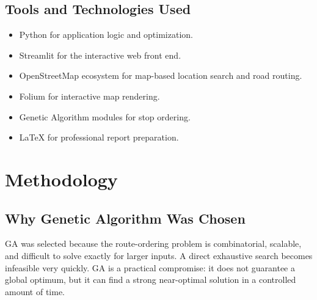 
\subsection{Tools and Technologies Used}
\begin{itemize}[leftmargin=1.5em]
    \item Python for application logic and optimization.
    \item Streamlit for the interactive web front end.
    \item OpenStreetMap ecosystem for map-based location search and road routing.
    \item Folium for interactive map rendering.
    \item Genetic Algorithm modules for stop ordering.
    \item LaTeX for professional report preparation.
\end{itemize}

\section{Methodology}
\subsection{Why Genetic Algorithm Was Chosen}
GA was selected because the route-ordering problem is combinatorial, scalable, and difficult to solve exactly for larger inputs. A direct exhaustive search becomes infeasible very quickly. GA is a practical compromise: it does not guarantee a global optimum, but it can find a strong near-optimal solution in a controlled amount of time.

